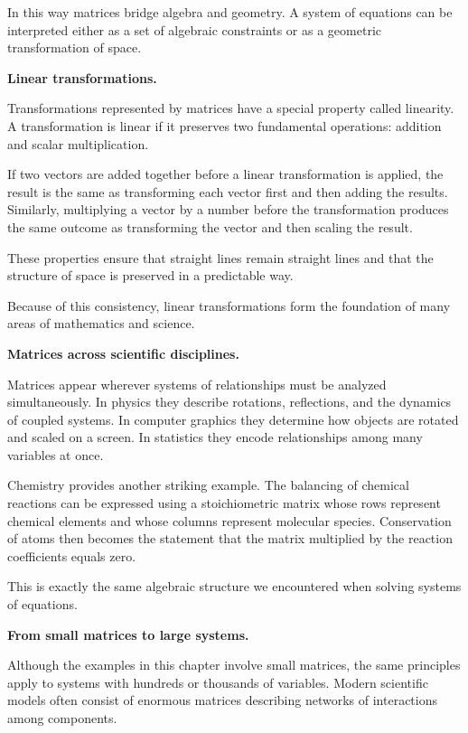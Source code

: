 \documentclass[11pt, openany]{book}
\theoremstyle{plain}
\theoremstyle{definition}
\theoremstyle{remark}
\begin{document}
In this way matrices bridge algebra and geometry. A system of equations
can be interpreted either as a set of algebraic constraints or as a
geometric transformation of space.

\medskip

\textbf{Linear transformations.}

Transformations represented by matrices have a special property called
linearity. A transformation is linear if it preserves two fundamental
operations: addition and scalar multiplication.

If two vectors are added together before a linear transformation is
applied, the result is the same as transforming each vector first and
then adding the results. Similarly, multiplying a vector by a number
before the transformation produces the same outcome as transforming the
vector and then scaling the result.

These properties ensure that straight lines remain straight lines and
that the structure of space is preserved in a predictable way.

Because of this consistency, linear transformations form the foundation
of many areas of mathematics and science.

\medskip

\textbf{Matrices across scientific disciplines.}

Matrices appear wherever systems of relationships must be analyzed
simultaneously. In physics they describe rotations, reflections, and the
dynamics of coupled systems. In computer graphics they determine how
objects are rotated and scaled on a screen. In statistics they encode
relationships among many variables at once.

Chemistry provides another striking example. The balancing of chemical
reactions can be expressed using a stoichiometric matrix whose rows
represent chemical elements and whose columns represent molecular
species. Conservation of atoms then becomes the statement that the
matrix multiplied by the reaction coefficients equals zero.

This is exactly the same algebraic structure we encountered when solving
systems of equations.

\medskip

\textbf{From small matrices to large systems.}

Although the examples in this chapter involve small matrices, the same
principles apply to systems with hundreds or thousands of variables.
Modern scientific models often consist of enormous matrices describing
networks of interactions among components.
\end{document}

